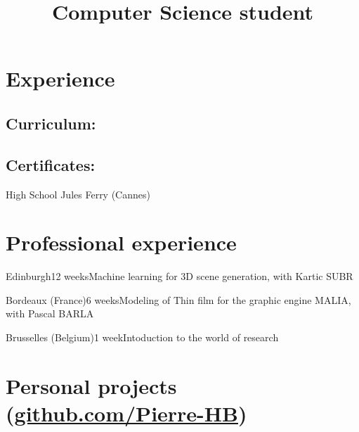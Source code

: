 \documentclass[11pt,a4paper]{moderncv}
\title{Computer Science student}
\begin{document}
\maketitle

\vspace{-1.5cm}

\section{\textbf{Experience}}

\subsection{\textbf{Curriculum:}}




\subsection{\textbf{Certificates:}}

{}
{High School Jules Ferry (Cannes)}{}{}



\section{\textbf{Professional experience}}

{Edinburgh}{12 weeks}{Machine learning for 3D scene generation, with Kartic SUBR}

{Bordeaux (France)}{6 weeks}{Modeling of Thin film for the graphic engine MALIA, with Pascal BARLA}

{Brusselles (Belgium)}{1 week}{Intoduction to the world of research}




\section{\textbf{Personal projects} (\href{https://github.com/Pierre-HB}{github.com/Pierre-HB})}
\end{document}
